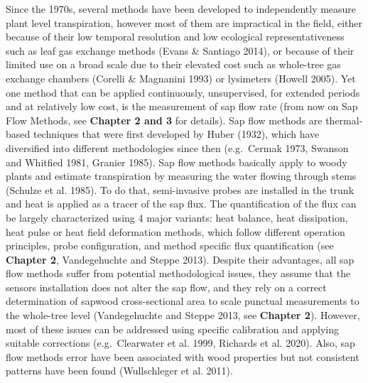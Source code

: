 \documentclass[11pt,twoside]{reedthesis}
\begin{document}
Since the 1970s, several methods have been developed to independently
measure plant level transpiration, however most of them are impractical
in the field, either because of their low temporal resolution and low
ecological representativeness such as leaf gas exchange methods (Evans
\& Santiago 2014), or because of their limited use on a broad scale due
to their elevated cost such as whole-tree gas exchange chambers (Corelli
\& Magnanini 1993) or lysimeters (Howell 2005). Yet one method that can
be applied continuously, unsupervised, for extended periods and at
relatively low cost, is the measurement of sap flow rate (from now on
Sap Flow Methods, see \textbf{Chapter 2 and 3} for details). Sap flow
methods are thermal-based techniques that were first developed by Huber
(1932), which have diversified into different methodologies since then
(e.g.~Cermak 1973, Swanson and Whitfied 1981, Granier 1985). Sap flow
methods basically apply to woody plants and estimate transpiration by
measuring the water flowing through stems (Schulze et al. 1985). To do
that, semi-invasive probes are installed in the trunk and heat is
applied as a tracer of the sap flux. The quantification of the flux can
be largely characterized using 4 major variants: heat balance, heat
dissipation, heat pulse or heat field deformation methods, which follow
different operation principles, probe configuration, and method specific
flux quantification (see \textbf{Chapter 2}, Vandegehuchte and Steppe
2013). Despite their advantages, all sap flow methods suffer from
potential methodological issues, they assume that the sensors
installation does not alter the sap flow, and they rely on a correct
determination of sapwood cross-sectional area to scale punctual
measurements to the whole-tree level (Vandegehuchte and Steppe 2013, see
\textbf{Chapter 2}). However, most of these issues can be addressed
using specific calibration and applying suitable corrections
(e.g.~Clearwater et al. 1999, Richards et al. 2020). Also, sap flow
methods error have been associated with wood properties but not
consistent patterns have been found (Wullschleger et al. 2011).\par
\end{document}
